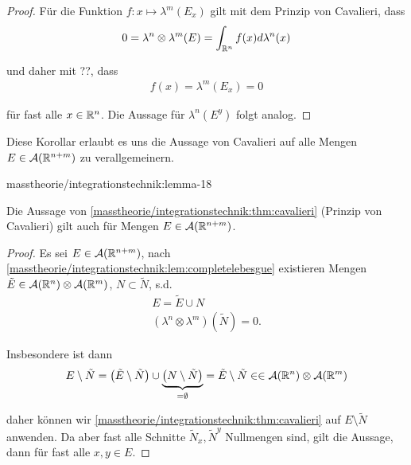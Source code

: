 \begin{proof}
 Für die Funktion \(f:x\mapsto \lambda^m(E_x)\) gilt mit dem Prinzip von Cavalieri, dass
\begin{align*}
0 = \lambda^{n}\otimes\lambda^{m}(E) = \int_{\mathbb{R}^n} f(x)d\lambda^n(x)
\end{align*}
\par
und daher mit ??, dass
\begin{align*}
f(x)=\lambda^m(E_x)=0
\end{align*}
\par
für fast alle \(x\in\mathbb{R}^n\). Die Aussage für \(\lambda^n(E^y)\) folgt analog.
\end{proof}

\par
Diese Korollar erlaubt es uns die Aussage von Cavalieri auf alle Mengen \(E\in \mathcal{A}(\mathbb{R}^{n+m})\) zu verallgemeinern.
\begin{lemma}{}{masstheorie/integrationstechnik:lemma-18}



\par
Die Aussage von \cref{masstheorie/integrationstechnik:thm:cavalieri} (Prinzip von Cavalieri) gilt auch für Mengen \(E\in \mathcal{A}(\mathbb{R}^{n+m})\).
\end{lemma}

\begin{proof}
 Es sei \(E\in \mathcal{A}(\mathbb{R}^{n+m})\), nach \cref{masstheorie/integrationstechnik:lem:completelebesgue} existieren Mengen \(\tilde{E}\in\mathcal{A}(\mathbb{R}^n)\otimes\mathcal{A}(\mathbb{R}^m)\), \(N\subset \tilde{N}\), s.d.
\begin{align*}
E = \tilde{E}\cup N\\
(\lambda^n\otimes\lambda^m)(\tilde{N}) = 0.
\end{align*}
\par
Insbesondere ist dann
\begin{align*}
E\setminus \tilde{N} = \left(\tilde{E}\setminus \tilde{N} \right)\cup \underbrace{\left(N\setminus \tilde{N}\right)}_{=\emptyset} = 
\tilde{E}\setminus \tilde{N}\in \in\mathcal{A}(\mathbb{R}^n)\otimes\mathcal{A}(\mathbb{R}^m)
\end{align*}
\par
daher können wir \cref{masstheorie/integrationstechnik:thm:cavalieri} auf \(E\setminus \tilde{N}\) anwenden. Da aber fast alle Schnitte \(\tilde{N}_x,\tilde{N}^y\) Nullmengen sind, gilt die Aussage, dann für fast alle \(x,y\in E\).
\end{proof}

